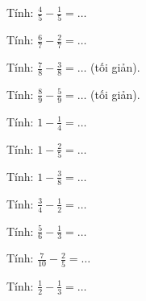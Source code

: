 \begin{ex}
Tính: $\frac{4}{5} - \frac{1}{5} = \dots$
\end{ex}

\begin{ex}
Tính: $\frac{6}{7} - \frac{2}{7} = \dots$
\end{ex}

\begin{ex}
Tính: $\frac{7}{8} - \frac{3}{8} = \dots$ (tối giản).
\end{ex}

\begin{ex}
Tính: $\frac{8}{9} - \frac{5}{9} = \dots$ (tối giản).
\end{ex}

\begin{ex}
Tính: $1 - \frac{1}{4} = \dots$
\end{ex}

\begin{ex}
Tính: $1 - \frac{2}{5} = \dots$
\end{ex}

\begin{ex}
Tính: $1 - \frac{3}{8} = \dots$
\end{ex}

\begin{ex}
Tính: $\frac{3}{4} - \frac{1}{2} = \dots$
\end{ex}

\begin{ex}
Tính: $\frac{5}{6} - \frac{1}{3} = \dots$
\end{ex}

\begin{ex}
Tính: $\frac{7}{10} - \frac{2}{5} = \dots$
\end{ex}

\begin{ex}
Tính: $\frac{1}{2} - \frac{1}{3} = \dots$
\end{ex}

